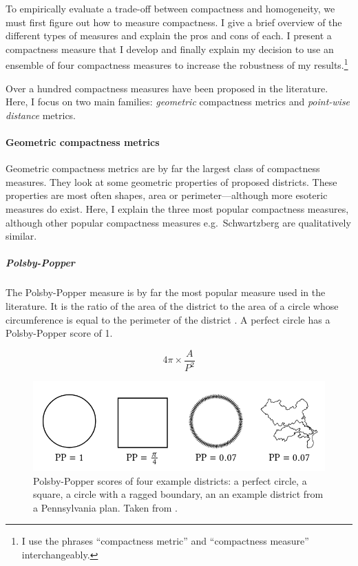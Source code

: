 \documentclass[]{article}
\let\oldparagraph\paragraph
\renewcommand{\paragraph}[1]{\oldparagraph{#1}\mbox{}}
\let\oldsubparagraph\subparagraph
\renewcommand{\subparagraph}[1]{\oldsubparagraph{#1}\mbox{}}
\begin{document}
To empirically evaluate a trade-off between compactness and homogeneity,
we must first figure out how to measure compactness. I give a brief
overview of the different types of measures and explain the pros and
cons of each. I present a compactness measure that I develop and finally
explain my decision to use an ensemble of four compactness measures to
increase the robustness of my results.\footnote{I use the phrases
  ``compactness metric'' and ``compactness measure'' interchangeably.}

Over a hundred compactness measures have been proposed in the
literature. Here, I focus on two main families: \emph{geometric}
compactness metrics and \emph{point-wise distance} metrics.

\hypertarget{geometric-compactness-metrics}{%
\paragraph{Geometric compactness
metrics}\label{geometric-compactness-metrics}}

Geometric compactness metrics are by far the largest class of
compactness measures. They look at some geometric properties of proposed
districts. These properties are most often shapes, area or
perimeter---although more esoteric measures do exist. Here, I explain
the three most popular compactness measures, although other popular
compactness measures e.g.~Schwartzberg are qualitatively similar.

\hypertarget{polsby-popper}{%
\subparagraph{Polsby-Popper}\label{polsby-popper}}

The Polsby-Popper measure is by far the most popular measure used in the
literature. It is the ratio of the area of the district to the area of a
circle whose circumference is equal to the perimeter of the district
\citep{pp1991}. A perfect circle has a Polsby-Popper score of 1.

\[4\pi \times \frac{A}{P^2}\]

\begin{figure}
\centering
\includegraphics{img/pp_example.png}
\caption{Polsby-Popper scores of four example districts: a perfect
circle, a square, a circle with a ragged boundary, an an example
district from a Pennsylvania plan. Taken from \cite{s2020}.}
\end{figure}
\end{document}
